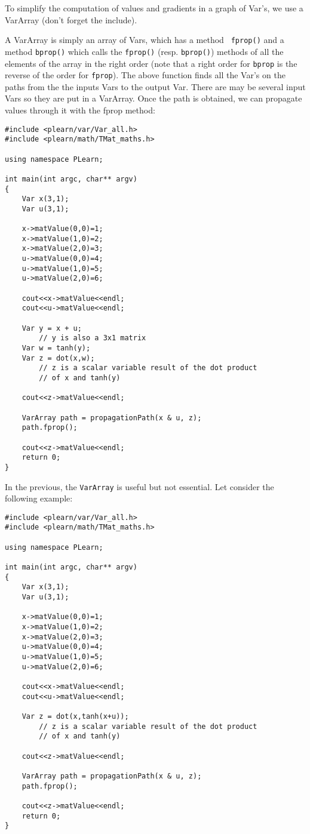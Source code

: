 \documentclass[11pt]{book}
\begin{document}
 To simplify the computation of values and gradients in a graph of
Var's, we use a VarArray (don't forget the include).

 A VarArray is simply an array of Vars, which has a method {\tt
fprop()} and a method {\tt bprop()} which calls the {\tt fprop()}
(resp. {\tt bprop()}) methods of all the elements of the array in the
right order (note that a right order for {\tt bprop} is the reverse of
the order for {\tt fprop}). The above function finds all the Var's on
the paths from the the inputs Vars to the output Var. There are may
be several input Vars so they are put in a VarArray. Once the path
is obtained, we can propagate values through it with the fprop method:

\begin{verbatim}
#include <plearn/var/Var_all.h>
#include <plearn/math/TMat_maths.h>

using namespace PLearn;

int main(int argc, char** argv)
{
    Var x(3,1);
    Var u(3,1);

    x->matValue(0,0)=1;
    x->matValue(1,0)=2;
    x->matValue(2,0)=3;
    u->matValue(0,0)=4;
    u->matValue(1,0)=5;
    u->matValue(2,0)=6;

    cout<<x->matValue<<endl;
    cout<<u->matValue<<endl;

    Var y = x + u;
        // y is also a 3x1 matrix
    Var w = tanh(y);
    Var z = dot(x,w);
        // z is a scalar variable result of the dot product
        // of x and tanh(y)

    cout<<z->matValue<<endl;

    VarArray path = propagationPath(x & u, z);
    path.fprop();

    cout<<z->matValue<<endl;
    return 0;
}
\end{verbatim}

In the previous, the \texttt{VarArray} is useful but not essential. Let
consider the following example:

\begin{verbatim}
#include <plearn/var/Var_all.h>
#include <plearn/math/TMat_maths.h>

using namespace PLearn;

int main(int argc, char** argv)
{
    Var x(3,1);
    Var u(3,1);

    x->matValue(0,0)=1;
    x->matValue(1,0)=2;
    x->matValue(2,0)=3;
    u->matValue(0,0)=4;
    u->matValue(1,0)=5;
    u->matValue(2,0)=6;

    cout<<x->matValue<<endl;
    cout<<u->matValue<<endl;

    Var z = dot(x,tanh(x+u));
        // z is a scalar variable result of the dot product
        // of x and tanh(y)

    cout<<z->matValue<<endl;

    VarArray path = propagationPath(x & u, z);
    path.fprop();

    cout<<z->matValue<<endl;
    return 0;
}
\end{verbatim}
\end{document}
